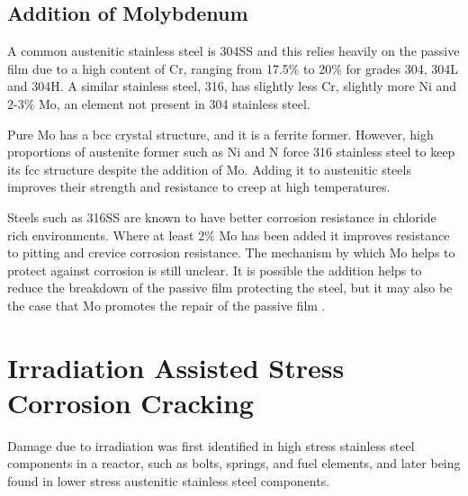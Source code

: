 \subsection{Addition of Molybdenum}

A common austenitic stainless steel is \gls{304SS} and this relies heavily on the passive film due to a high content of Cr, ranging from 17.5\% to 20\% for grades 304, 304L and 304H.  A similar stainless steel, 316, has slightly less Cr, slightly more Ni and 2-3\% Mo, an element not present in 304 stainless steel.

Pure Mo has a \acrshort{bcc} crystal structure, and it is a ferrite former.  However, high proportions of austenite former such as Ni and N force 316 stainless steel to keep its \acrshort{fcc} structure despite the addition of Mo.  Adding it to austenitic steels improves their strength and resistance to creep at high temperatures.  

Steels such as \gls{316SS} are known to have better corrosion resistance in chloride rich environments.  Where at least 2\% Mo has been added it improves resistance to pitting and crevice corrosion resistance\cite{corrosionmo}.  The mechanism by which Mo helps to protect against corrosion is still unclear.  It is possible the addition helps to reduce the breakdown of the passive film protecting the steel, but it may also be the case that Mo promotes the repair of the passive film \cite{moprotection}.


















\section[IASCC]{Irradiation Assisted Stress Corrosion Cracking}

\FloatBarrier

Damage due to irradiation was first identified in high stress stainless steel components in a reactor, such as bolts, springs, and fuel elements\cite{gswasiascc}\cite{iascckenikjonesbell}, and later being found in lower stress austenitic stainless steel components\cite{iascckenikjonesbell}.

